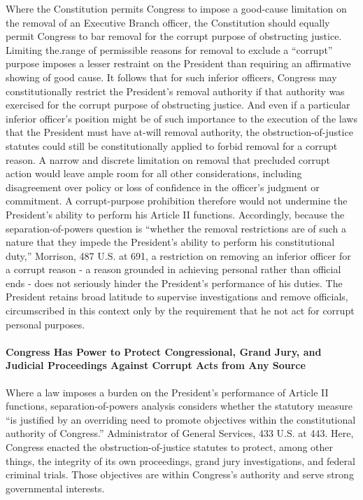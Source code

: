 Where the Constitution permits Congress to impose a good-cause limitation on the removal of an Executive Branch officer, the Constitution should equally permit Congress to bar removal for the corrupt purpose of obstructing justice.
Limiting the.range of permissible reasons for removal to exclude a “corrupt” purpose imposes a lesser restraint on the President than requiring an affirmative showing of good cause.
It follows that for such inferior officers, Congress may constitutionally restrict the President’s removal authority if that authority was exercised for the corrupt purpose of obstructing justice.
And even if a particular inferior officer’s position might be of such importance to the execution of the laws that the President must have at-will removal authority, the obstruction-of-justice statutes could still be constitutionally applied to forbid removal for a corrupt reason.%
A narrow and discrete limitation on removal that precluded corrupt action would leave ample room for all other considerations, including disagreement over policy or loss of confidence in the officer’s judgment or commitment.
A corrupt-purpose prohibition therefore would not undermine the President’s ability to perform his Article II functions.
Accordingly, because the separation-of-powers question is “whether the removal restrictions are of such a nature that they impede the President’s ability to perform his constitutional duty,” Morrison, 487 U.S. at 691, a restriction on removing an inferior officer for a corrupt reason - a reason grounded in achieving personal rather than official ends - does not seriously hinder the President’s performance of his duties.
The President retains broad latitude to supervise investigations and remove officials, circumscribed in this context only by the requirement that he not act for corrupt personal purposes.%

\paragraph{Congress Has Power to Protect Congressional, Grand Jury, and Judicial Proceedings Against Corrupt Acts from Any Source}

Where a law imposes a burden on the President’s performance of Article II functions, separation-of-powers analysis considers whether the statutory measure “is justified by an overriding need to promote objectives within the constitutional authority of Congress.”
Administrator of General Services, 433 U.S. at 443.
Here, Congress enacted the obstruction-of-justice statutes to protect, among other things, the integrity of its own proceedings, grand jury investigations, and federal criminal trials.
Those objectives are within Congress’s authority and serve strong governmental interests.

